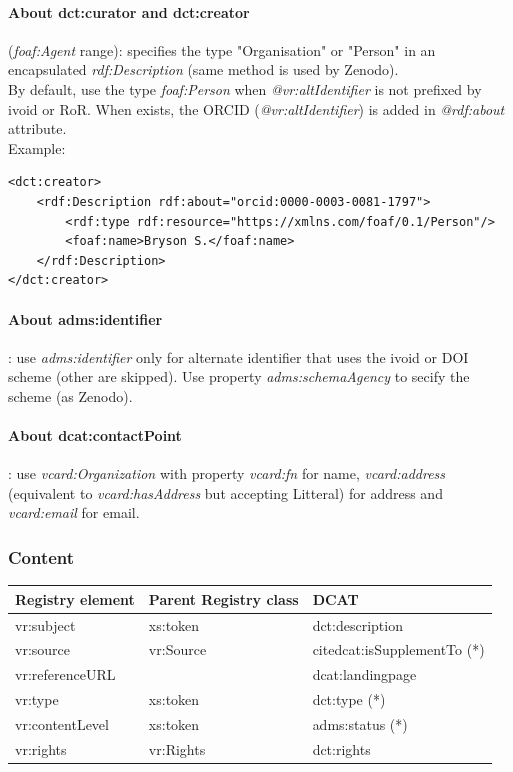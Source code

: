 \documentclass[11pt,a4paper]{ivoa}
\begin{document}
\paragraph{About dct:curator and dct:creator} (\textit{foaf:Agent} range):  specifies the type "Organisation" or "Person" in an encapsulated \textit{rdf:Description} (same method is used by Zenodo).\\
By default, use the type \textit{foaf:Person} when \textit{@vr:altIdentifier} is not prefixed by ivoid or RoR.
When exists, the ORCID (\textit{@vr:altIdentifier}) is added in \textit{@rdf:about} attribute.\\

Example:
\begin{lstlisting}
<dct:creator>
    <rdf:Description rdf:about="orcid:0000-0003-0081-1797">
        <rdf:type rdf:resource="https://xmlns.com/foaf/0.1/Person"/>
        <foaf:name>Bryson S.</foaf:name>
    </rdf:Description>
</dct:creator>
\end{lstlisting}

\paragraph{About adms:identifier}: use \textit{adms:identifier} only for alternate identifier that uses the ivoid or DOI scheme (other are skipped). Use property \textit{adms:schemaAgency} to secify the scheme (as Zenodo). 

\paragraph{About dcat:contactPoint}:
use \textit{vcard:Organization} with property \textit{vcard:fn} for name, \textit{vcard:address} (equivalent to \textit{vcard:hasAddress} but accepting Litteral) for address and \textit{vcard:email} for email.


\subsubsection{Content}

\begin{tabular}{|l|l|l|} \hline
	\textbf{Registry element} & \textbf{Parent Registry class} & \textbf{DCAT}  \\ \hline
	vr:subject & xs:token & dct:description \\ \hline
	vr:source & vr:Source & citedcat:isSupplementTo (*)\\ \hline
	vr:referenceURL & & dcat:landingpage \\ \hline
	vr:type & xs:token & dct:type (*)\\ \hline
    vr:contentLevel & xs:token & adms:status (*)\\ \hline
	vr:rights & vr:Rights & dct:rights\\ \hline
\end{tabular}    
\end{document}
